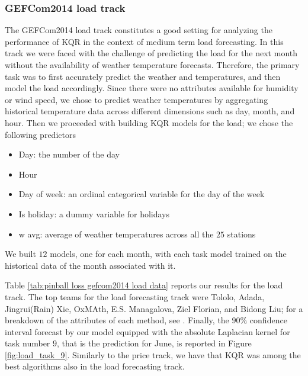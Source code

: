 \subsubsection{GEFCom2014 load track}
The GEFCom2014 load track constitutes a good setting for analyzing the performance of KQR in the context of medium term load forecasting.
In this track we were faced with the challenge of predicting the load for the next month without the availability of weather temperature forecasts. 
Therefore, the primary task was to first accurately predict the weather and temperatures, and then model the load accordingly. Since there were no attributes available for humidity or wind speed, we chose to predict weather temperatures by aggregating historical temperature data across different dimensions such as day, month, and hour. Then we proceeded with building KQR models for the load; we chose the following predictors
\begin{itemize}
    \item Day: the number of the day
    \item Hour
    \item Day of week: an ordinal categorical variable for the day of the week
    \item Is holiday: a dummy variable for holidays
    \item w avg: average of weather temperatures across all the $25$ stations
\end{itemize}
We built $12$ models, one for each month, with each task model trained on the historical data of the month associated with it.

Table \ref{tab:pinball loss gefcom2014 load data} reports our results for the load track. The top teams for the load forecasting track were Tololo, Adada, Jingrui(Rain) Xie, OxMAth, E.S. Managalova, Ziel Florian, and Bidong Liu; for a breakdown of the attributes of each method, see \cite[Table 6]{hong2016probabilistic}.
Finally, the $90\%$ confidence interval forecast by our model equipped with the absolute Laplacian kernel for task number $9$, that is the prediction for June, is reported in Figure \ref{fig:load_task_9}.
Similarly to the price track, we have that KQR was among the best algorithms also in the load forecasting track.

